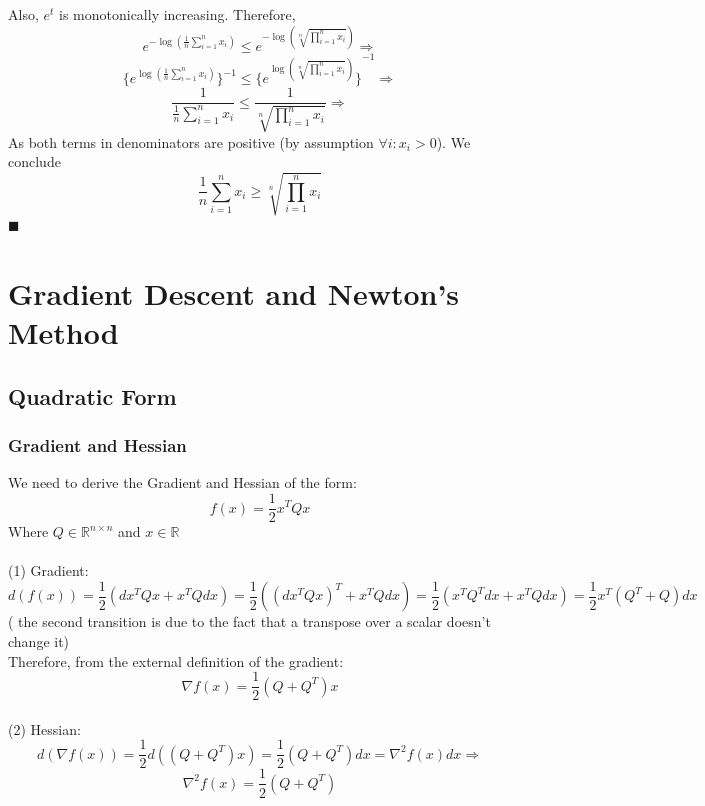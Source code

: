 \documentclass[12pt]{article}
\newcommand{\qed}{\hfill$\blacksquare$}
\begin{document}
Also, $e^t$ is monotonically increasing. Therefore,
$$e^{-\log(\frac{1}{n} \sum_{i=1}^n x_i)} \leq e^{-\log(\sqrt[n]{\prod_{i=1}^n x_i})} \Rightarrow$$
$$\{e^{\log{(\frac{1}{n} \sum_{i=1}^n x_i)}}\}^{-1} \leq {\{e^{\log(\sqrt[n]{\prod_{i=1}^n x_i})}\}}^{-1} \Rightarrow$$
$$\frac{1}{\frac{1}{n} \sum_{i=1}^n x_i} \leq \frac{1}{\sqrt[n]{\prod_{i=1}^n x_i}}\Rightarrow$$
As both terms in denominators are positive (by assumption $\forall i : x_i > 0$). We conclude\\
$$\frac{1}{n} \sum_{i=1}^n x_i \geq \sqrt[n]{\prod_{i=1}^n x_i}$$
\qed

\newpage

\section{Gradient Descent
and Newton’s Method}

\subsection{Quadratic Form}

\subsubsection{Gradient and Hessian}
We need to derive the Gradient and Hessian of the form:
$$f(x)=\frac{1}{2} x^T Q x$$
Where $Q \in \mathbb{R}^{n \times n}$ and $x \in \mathbb{R}$\\
\\
(1) Gradient: $$d(f(x)) = \frac{1}{2}(dx^T Q x + x^T Q dx) = \frac{1}{2}((dx^T Q x)^T + x^T Q dx) = \frac{1}{2}(x^T Q^T dx + x^T Q dx) = \frac{1}{2} x^T (Q^T + Q) dx$$
( the second transition is due to the fact that a transpose over a scalar doesn't change it)\\
Therefore, from the external definition of the gradient:
$$\nabla f(x) = \frac{1}{2} (Q + Q^T)x$$
\\
(2) Hessian:\\
$$d(\nabla f(x)) =  \frac{1}{2} d((Q + Q^T)x) = \frac{1}{2} (Q + Q^T)dx = \nabla^2 f(x) dx \Rightarrow$$
$$\nabla^2 f(x) = \frac{1}{2} (Q + Q^T)$$
\end{document}
